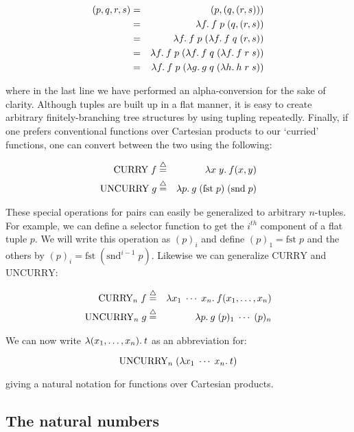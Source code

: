 \begin{eqnarray*}
(p,q,r,s) & = & (p,(q,(r,s)))                                            \\
          & = & \lambda f.\: f\; p\;  (q,(r,s))                              \\
          & = & \lambda f.\: f\; p\; (\lambda f.\: f\; q\; (r,s))                \\
          & = & \lambda f.\: f\; p\; (\lambda f.\: f\; q\; (\lambda f.\: f\; r\; s)) \\
          & = & \lambda f.\: f\; p\; (\lambda g.\: g\; q\; (\lambda h.\: h\; r\; s))
\end{eqnarray*}

\noindent where in the last line we have performed an alpha-conversion for the
sake of clarity. Although tuples are built up in a flat manner, it is easy to
create arbitrary finitely-branching tree structures by using tupling
repeatedly. Finally, if one prefers conventional functions over Cartesian
products to our `curried' functions, one can convert between the two using the
following:

\begin{eqnarray*}
\mbox{CURRY}\; f  & \stackrel{\bigtriangleup}{=} & \lambda x\; y.\: f(x,y)             \\
\mbox{UNCURRY}\;g & \stackrel{\bigtriangleup}{=} & \lambda p.\: g\; (\mbox{fst}\; p)\; (\mbox{snd}\; p)
\end{eqnarray*}

These special operations for pairs can easily be generalized to arbitrary
$n$-tuples. For example, we can define a selector function to get the $i^{th}$
component of a flat tuple $p$. We will write this operation as $(p)_i$ and
define $(p)_1 = \mbox{fst}\; p$ and the others by $(p)_i = \mbox{fst}\;
(\mbox{snd}^{i-1}\; p)$. Likewise we can generalize $\mbox{CURRY}$ and
$\mbox{UNCURRY}$:

\begin{eqnarray*}
\mbox{CURRY}_n\; f  & \stackrel{\bigtriangleup}{=} & \lambda x_1\; \cdots \; x_n.\: f(x_1,\ldots,x_n) \\
\mbox{UNCURRY}_n\;g & \stackrel{\bigtriangleup}{=} & \lambda p.\: g\; (p)_1 \; \cdots \; (p)_n
\end{eqnarray*}

\noindent We can now write $\lambda (x_1,\ldots,x_n).\: t$ as an abbreviation for:

$$\mbox{UNCURRY}_n\; (\lambda x_1\; \cdots \; x_n.\: t)$$

\noindent giving a natural notation for functions over Cartesian products.

\subsection{The natural numbers}

